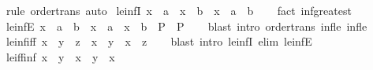 \begin{isabellebody}
%
\isatagproof
{}\isamarkupfalse%
\ {\isacharparenleft}{\kern0pt}rule\ order{\isacharunderscore}{\kern0pt}trans{\isacharparenright}{\kern0pt}\ auto%
\endisatagproof
{\isafoldproof}%
%
\isadelimproof
\isanewline
%
\endisadelimproof
\isanewline
{}\isamarkupfalse%
\ le{\isacharunderscore}{\kern0pt}infI{\isacharcolon}{\kern0pt}\ {\isachardoublequoteopen}x\ {\isasymle}\ a\ {\isasymLongrightarrow}\ x\ {\isasymle}\ b\ {\isasymLongrightarrow}\ x\ {\isasymle}\ a\ {\isasymsqinter}\ b{\isachardoublequoteclose}\isanewline
%
\isadelimproof
\ \ %
\endisadelimproof
%
\isatagproof
{}\isamarkupfalse%
\ {\isacharparenleft}{\kern0pt}fact\ inf{\isacharunderscore}{\kern0pt}greatest{\isacharparenright}{\kern0pt}%
\endisatagproof
{\isafoldproof}%
%
\isadelimproof
%
\endisadelimproof
\ \isanewline
\isanewline
{}\isamarkupfalse%
\ le{\isacharunderscore}{\kern0pt}infE{\isacharcolon}{\kern0pt}\ {\isachardoublequoteopen}x\ {\isasymle}\ a\ {\isasymsqinter}\ b\ {\isasymLongrightarrow}\ {\isacharparenleft}{\kern0pt}x\ {\isasymle}\ a\ {\isasymLongrightarrow}\ x\ {\isasymle}\ b\ {\isasymLongrightarrow}\ P{\isacharparenright}{\kern0pt}\ {\isasymLongrightarrow}\ P{\isachardoublequoteclose}\isanewline
%
\isadelimproof
\ \ %
\endisadelimproof
%
\isatagproof
{}\isamarkupfalse%
\ {\isacharparenleft}{\kern0pt}blast\ intro{\isacharcolon}{\kern0pt}\ order{\isacharunderscore}{\kern0pt}trans\ inf{\isacharunderscore}{\kern0pt}le{}\ inf{\isacharunderscore}{\kern0pt}le{}{\isacharparenright}{\kern0pt}%
\endisatagproof
{\isafoldproof}%
%
\isadelimproof
\isanewline
%
\endisadelimproof
\isanewline
{}\isamarkupfalse%
\ le{\isacharunderscore}{\kern0pt}inf{\isacharunderscore}{\kern0pt}iff{\isacharcolon}{\kern0pt}\ {\isachardoublequoteopen}x\ {\isasymle}\ y\ {\isasymsqinter}\ z\ {\isasymlongleftrightarrow}\ x\ {\isasymle}\ y\ {\isasymand}\ x\ {\isasymle}\ z{\isachardoublequoteclose}\isanewline
%
\isadelimproof
\ \ %
\endisadelimproof
%
\isatagproof
{}\isamarkupfalse%
\ {\isacharparenleft}{\kern0pt}blast\ intro{\isacharcolon}{\kern0pt}\ le{\isacharunderscore}{\kern0pt}infI\ elim{\isacharcolon}{\kern0pt}\ le{\isacharunderscore}{\kern0pt}infE{\isacharparenright}{\kern0pt}%
\endisatagproof
{\isafoldproof}%
%
\isadelimproof
\isanewline
%
\endisadelimproof
\isanewline
{}\isamarkupfalse%
\ le{\isacharunderscore}{\kern0pt}iff{\isacharunderscore}{\kern0pt}inf{\isacharcolon}{\kern0pt}\ {\isachardoublequoteopen}x\ {\isasymle}\ y\ {\isasymlongleftrightarrow}\ x\ {\isasymsqinter}\ y\ {\isacharequal}{\kern0pt}\ x{\isachardoublequoteclose}\isanewline

\end{isabellebody}
